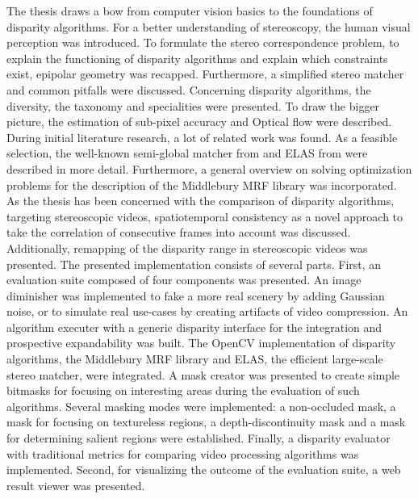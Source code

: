 The thesis draws a bow from computer vision basics to the foundations of disparity algorithms.
For a better understanding of stereoscopy, the human visual perception was introduced.
To formulate the stereo correspondence problem, to explain the functioning of disparity algorithms and explain which constraints exist, epipolar geometry was recapped.
Furthermore, a simplified stereo matcher and common pitfalls were discussed.
\newline\newline\noindent Concerning disparity algorithms, the diversity, the taxonomy and specialities were presented.
To draw the bigger picture, the estimation of sub-pixel accuracy and Optical flow were described.
During initial literature research, a lot of related work was found.
As a feasible selection, the well-known semi-global matcher from \citeauthor{hirschmuller2005accurate} \citep{hirschmuller2005accurate} and ELAS from \citeauthor{Geiger2010ACCV} \citep{Geiger2010ACCV} were described in more detail.
Furthermore, a general overview on solving optimization problems for the description of the Middlebury MRF library was incorporated.
As the thesis has been concerned with the comparison of disparity algorithms, targeting stereoscopic videos, spatiotemporal consistency as a novel approach to take the correlation of consecutive frames into account was discussed.
Additionally, remapping of the disparity range in stereoscopic videos was presented.
\newline\newline\noindent The presented implementation consists of several parts.
First, an evaluation suite composed of four components was presented.
An image diminisher was implemented to fake a more real scenery by adding Gaussian noise, or to simulate real use-cases by creating artifacts of video compression.
An algorithm executer with a generic disparity interface for the integration and prospective expandability was built.
The OpenCV implementation of disparity algorithms, the Middlebury MRF library and ELAS, the efficient large-scale stereo matcher, were integrated.
A mask creator was presented to create simple bitmasks for focusing on interesting areas during the evaluation of such algorithms.
Several masking modes were implemented:
a non-occluded mask, a mask for focusing on textureless regions, a depth-discontinuity mask and a mask for determining salient regions were established.
Finally, a disparity evaluator with traditional metrics for comparing video processing algorithms was implemented.
Second, for visualizing the outcome of the evaluation suite, a web result viewer was presented.
